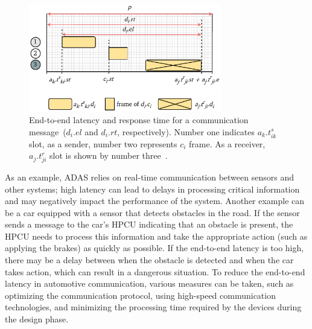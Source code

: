         
        \begin{figure}
    	\centering
    	\includegraphics[width=0.75\textwidth]{figures/latency.pdf}
    	\caption{ End-to-end latency and response time for a communication message~($d_i.el$ and $d_i.rt$, respectively). Number one indicates $a_k.t_{ik}^{s}$ slot, as a sender, number two represents $c_i$ frame. As a receiver, $a_j.t_{ji}^{r}$ slot is shown by number three~\cite{askaripoor2023designer}.}
    	\label{fig4_new}
        \end{figure}
    
    As an example, ADAS relies on real-time communication between sensors and other systems; high latency can lead to delays in processing critical information and may negatively impact the performance of the system.
    Another example can be a car equipped with a sensor that detects obstacles in the road. If the sensor sends a message to the car's HPCU indicating that an obstacle is present, the HPCU needs to process this information and take the appropriate action (such as applying the brakes) as quickly as possible. If the end-to-end latency is too high, there may be a delay between when the obstacle is detected and when the car takes action, which can result in a dangerous situation.
    To reduce the end-to-end latency in automotive communication, various measures can be taken, such as optimizing the communication protocol, using high-speed communication technologies, and minimizing the processing time required by the devices during the design phase.
     
